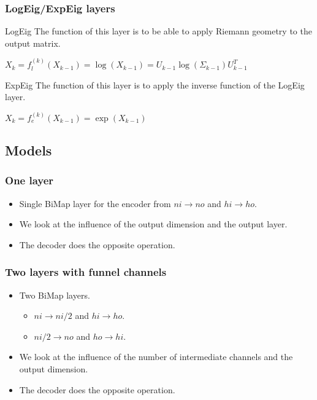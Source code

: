 \documentclass{beamer}
\begin{document}
\begin{frame}
\frametitle{LogEig/ExpEig layers}

\begin{block}{LogEig}
    The function of this layer is to be able to apply Riemann geometry to the output matrix.
\end{block}

\begin{center}
    $ X_k = f_l^{(k)}(X_{k-1})=\log (X_{k-1})=U_{k-1}\log(\Sigma_{k-1})U_{k-1}^T$
\end{center}

\begin{block}{ExpEig}
    The function of this layer is to apply the inverse function of the LogEig layer.
\end{block}

\begin{center}
    $ X_k = f_e^{(k)}(X_{k-1})=\exp (X_{k-1})$
\end{center}

\end{frame}
\subsection{Models}
\begin{frame}
\frametitle{One layer}
\begin{itemize}
    \item Single BiMap layer for the encoder from $ni\rightarrow no$ and $hi\rightarrow ho$.
    \item We look at the influence of the output dimension and the output layer.
    \item The decoder does the opposite operation.
\end{itemize}
\begin{center}
    {\tiny
    
    }
\end{center}

\end{frame}

\begin{frame}
\frametitle{Two layers with funnel channels}
\begin{itemize}
    \item Two BiMap layers.
        \begin{itemize}
            \item $ni\rightarrow ni/2$ and $hi\rightarrow ho$.
            \item $ni/2\rightarrow no$ and $ho\rightarrow hi$.
        \end{itemize}
        \item We look at the influence of the number of intermediate channels and the output dimension.
        \item The decoder does the opposite operation.
\end{itemize}
\begin{center}
    {\tiny
    
    }
\end{center}

\end{frame}
\end{document}
